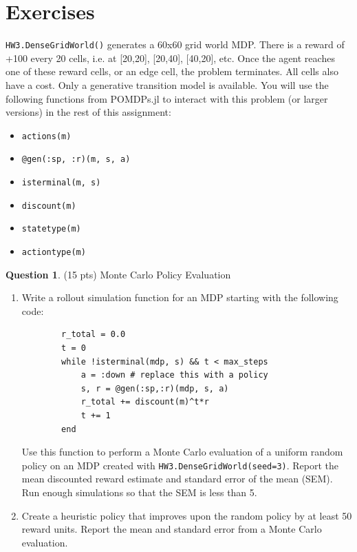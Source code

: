 \documentclass{article}
\theoremstyle{definition}
\newtheorem{question}[thm]{Question}
\begin{document}
\section{Exercises}
    \texttt{HW3.DenseGridWorld()} generates a 60x60 grid world MDP. There is a reward of +100 every 20 cells, i.e. at [20,20], [20,40], [40,20], etc. Once the agent reaches one of these reward cells, or an edge cell, the problem terminates. All cells also have a cost. Only a generative transition model is available. You will use the following functions from POMDPs.jl to interact with this problem (or larger versions) in the rest of this assignment:
    \begin{itemize}[nosep]
        \item \texttt{actions(m)}
        \item \texttt{@gen(:sp, :r)(m, s, a)}
        \item \texttt{isterminal(m, s)}
        \item \texttt{discount(m)}
        \item \texttt{statetype(m)}
        \item \texttt{actiontype(m)}
    \end{itemize}

\begin{samepage}
\begin{question} (15 pts) Monte Carlo Policy Evaluation
    \begin{enumerate}[label=\alph*)]
        \item Write a rollout simulation function for an MDP starting with the following code:
            \begin{verbatim}
        r_total = 0.0
        t = 0
        while !isterminal(mdp, s) && t < max_steps
            a = :down # replace this with a policy
            s, r = @gen(:sp,:r)(mdp, s, a)
            r_total += discount(m)^t*r
            t += 1
        end
                \end{verbatim} Use this function to perform a Monte Carlo evaluation of a uniform random policy on an MDP created with \texttt{HW3.DenseGridWorld(seed=3)}. Report the mean discounted reward estimate and standard error of the mean (SEM). Run enough simulations so that the SEM is less than 5.
         \item Create a heuristic policy that improves upon the random policy by at least 50 reward units. Report the mean and standard error from a Monte Carlo evaluation.
    \end{enumerate}
\end{question}
\end{samepage}
\end{document}
